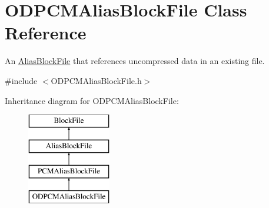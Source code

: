 \hypertarget{class_o_d_p_c_m_alias_block_file}{}\section{O\+D\+P\+C\+M\+Alias\+Block\+File Class Reference}
\label{class_o_d_p_c_m_alias_block_file}


An \hyperlink{class_alias_block_file}{Alias\+Block\+File} that references uncompressed data in an existing file.  




{\ttfamily \#include $<$O\+D\+P\+C\+M\+Alias\+Block\+File.\+h$>$}

Inheritance diagram for O\+D\+P\+C\+M\+Alias\+Block\+File\+:\begin{figure}[H]
\begin{center}
\leavevmode
\includegraphics[height=4.000000cm]{class_o_d_p_c_m_alias_block_file}
\end{center}
\end{figure}
